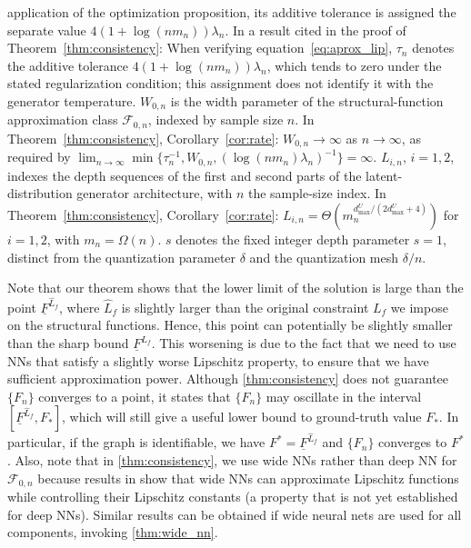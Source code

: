 \documentclass[12pt]{article}
\theoremstyle{plain}
\theoremstyle{definition}
\theoremstyle{remark}
\begin{document}
application of the optimization proposition, its additive tolerance is assigned the separate value $4(1+\log(nm_n))\lambda_n$. In a result cited in the proof of Theorem~\ref{thm:consistency}: When verifying equation~\ref{eq:aprox_lip}, $\tau_n$ denotes the additive tolerance $4(1+\log(nm_n))\lambda_n$, which tends to zero under the stated regularization condition; this assignment does not identify it with the generator temperature. $W_{0,n}$ is the width parameter of the structural-function approximation class $\mathcal{F}_{0,n}$, indexed by sample size $n$. In Theorem~\ref{thm:consistency}, Corollary~\ref{cor:rate}: $W_{0,n}\to\infty$ as $n\to\infty$, as required by $\lim_{n\to\infty}\min\{\tau_n^{-1},W_{0,n},(\log(nm_n)\lambda_n)^{-1}\}=\infty$. $L_{i,n}$, $i=1,2$, indexes the depth sequences of the first and second parts of the latent-distribution generator architecture, with $n$ the sample-size index. In Theorem~\ref{thm:consistency}, Corollary~\ref{cor:rate}: $L_{i,n}=\Theta(m_n^{d^U_{\max}/(2d^U_{\max}+4)})$ for $i=1,2$, with $m_n=\Omega(n)$. $s$ denotes the fixed integer depth parameter $s=1$, distinct from the quantization parameter $\delta$ and the quantization mesh $\delta/n$.

Note that our theorem shows that the lower limit of the solution is large than the point $\underline{{ F}}^{\hat{L}_f}$, where $\hat{L}_f$ is slightly larger than the original constraint $L_f$ we impose on the structural functions. Hence, this point can potentially be slightly smaller than the sharp bound $\underline{{F}}^{L_f}$. This worsening is due to the fact that we need to use NNs that satisfy a slightly worse Lipschitz property, to ensure that we have sufficient approximation power. Although \cref{thm:consistency} does not guarantee $\{F_n\}$ converges to a point, it states that $\{F_n\}$ may oscillate in the interval $[\underline{F}^{\hat{L}_f},F_*]$, which will still give a useful lower bound to ground-truth value $F_*$. In particular, if the graph is identifiable, we have $ F^* = \underline{F}^{\hat{L}_f}$ and $\{F_n\}$ converges to $F^*$. 
Also, note that in \cref{thm:consistency}, we use wide NNs rather than deep NN for $ \mathcal{F}_{0,n} $ because results in \cite{Yarotsky2018OptimalAO} show that wide NNs can approximate Lipschitz functions while controlling their Lipschitz constants (a property that is not yet established for deep NNs). Similar results can be obtained if wide neural nets are used for all components, invoking \cref{thm:wide_nn}.
\end{document}
